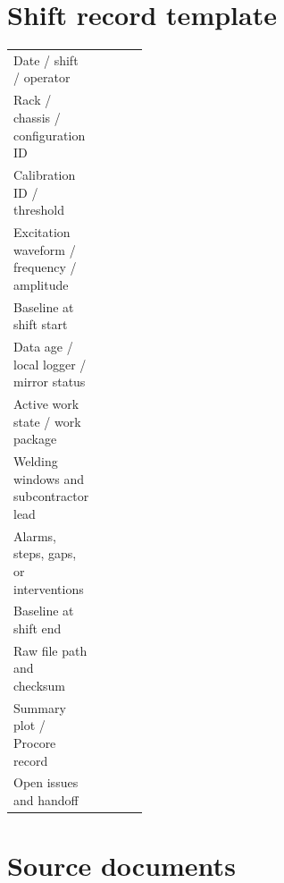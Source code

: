 \documentclass[11pt]{article}
\begin{document}
\section{Shift record template}

\begin{tabularx}{\linewidth}{@{}L{0.30\linewidth}Y@{}}
\toprule
Date / shift / operator & \\
Rack / chassis / configuration ID & \\
Calibration ID / threshold & \\
Excitation waveform / frequency / amplitude & \\
Baseline at shift start & \\
Data age / local logger / mirror status & \\
Active work state / work package & \\
Welding windows and subcontractor lead & \\
Alarms, steps, gaps, or interventions & \\
Baseline at shift end & \\
Raw file path and checksum & \\
Summary plot / Procore record & \\
Open issues and handoff & \\
\bottomrule
\end{tabularx}

\section{Source documents}
\end{document}
